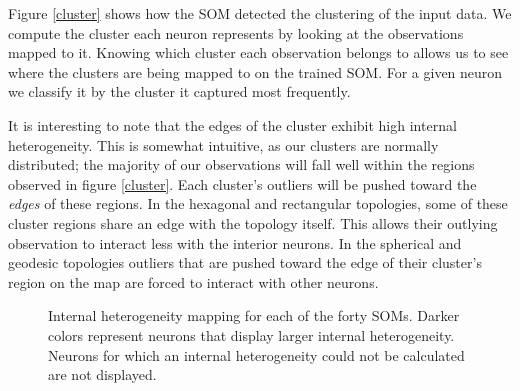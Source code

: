 Figure \ref{cluster} shows how the SOM detected the clustering of the input
data.  We compute the cluster each neuron represents by looking at the
observations mapped to it.  Knowing which cluster each observation belongs to
allows us to see where the clusters are being mapped to on the trained SOM. For a
given neuron we classify it by the cluster it captured most frequently. 

It is interesting to note that the edges of the cluster exhibit high internal heterogeneity.  
This is somewhat intuitive, as our clusters are normally distributed; the
majority of our observations will fall well within the regions observed in
figure \ref{cluster}. Each cluster's outliers will be pushed toward the
\emph{edges} of these regions. In the hexagonal and rectangular topologies,
some of these cluster regions share an edge with the topology itself.  This
allows their outlying observation to interact less with the interior neurons.
In the spherical and geodesic topologies outliers that are pushed toward the edge of
their cluster's region on the map are forced to interact with other neurons.



\begin{figure}
\centering
\begin{minipage}{\textwidth}
\caption{Internal heterogeneity mapping for each of the forty SOMs. Darker colors
represent neurons that display larger internal heterogeneity. Neurons for which
an internal heterogeneity could not be calculated are not displayed.}
\label{ten}
\end{minipage}
\end{figure}

